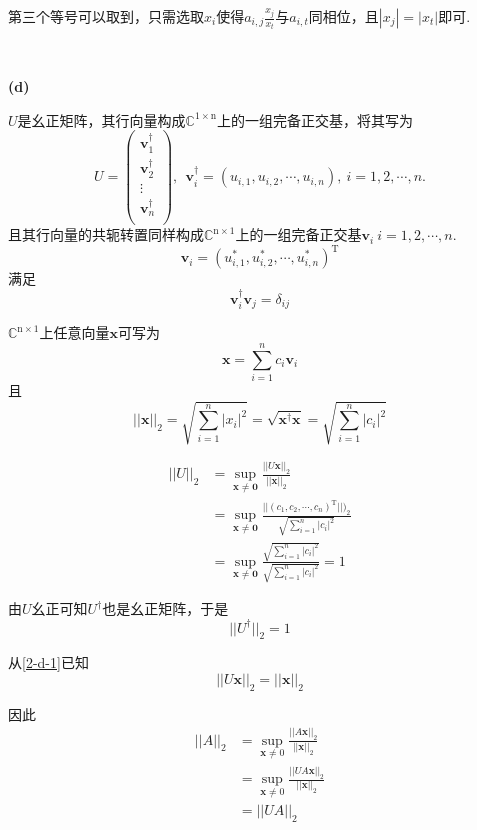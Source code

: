 \documentclass[UTF8]{ctexart}
\begin{document}
第三个等号可以取到，只需选取$x_i$使得$a_{i,j}\frac{x_j}{x_t}$与$a_{i,t}$同相位，且$|x_j|=|x_t|$即可.

~\

\noindent\textbf{(d)}

$U$是幺正矩阵，其行向量构成$\mathbb{C}^{\mathrm{1\times n}}$上的一组完备正交基，将其写为
$$
U=
\left(
    \begin{array}{c}
        \mathbf{v}_1^\dagger \\
        \mathbf{v}_2^\dagger \\
        \vdots\\
        \mathbf{v}_n^\dagger \\
    \end{array}
\right)
,\ \ 
\mathbf{v}_i^\dagger=(u_{i,1},u_{i,2},\cdots,u_{i,n}),\ i=1,2,\cdots,n.
$$
且其行向量的共轭转置同样构成$\mathbb{C}^{\mathrm{n\times 1}}$上的一组完备正交基$\mathbf{v}_i\ i=1,2,\cdots,n.$
$$
\mathbf{v}_i=(u_{i,1}^*,u_{i,2}^*,\cdots,u_{i,n}^*)^\mathrm{T}
$$
满足
$$\mathbf{v}_i^\dagger\mathbf{v}_j=\delta_{ij}$$

$\mathbb{C}^{\mathrm{n\times 1}}$上任意向量$\mathbf{x}$可写为
$$
\mathbf{x}=\sum_{i=1}^n c_i\mathbf{v}_i
$$
且
$$
||\mathbf{x}||_2=\sqrt{\sum_{i=1}^n|x_i|^2}=\sqrt{\mathbf{x}^\dagger\mathbf{x}}=\sqrt{\sum_{i=1}^n|c_i|^2}
$$

\begin{equation}\label{2-d-1}
\begin{aligned}
||U||_2&=\sup_{\mathbf{x}\neq \mathbf{0}}\frac{||U\mathbf{x}||_2}{||\mathbf{x}||_2}\\
&=\sup_{\mathbf{x}\neq \mathbf{0}}\frac{||(c_1,c_2,\cdots,c_n)^\mathrm{T}||)_2}{\sqrt{\sum_{i=1}^n|c_i|^2}}\\
&=\sup_{\mathbf{x}\neq \mathbf{0}}\frac{\sqrt{\sum_{i=1}^n|c_i|^2}}{\sqrt{\sum_{i=1}^n|c_i|^2}}=1
\end{aligned}
\end{equation}

由$U$幺正可知$U^\dagger$也是幺正矩阵，于是
\begin{equation}\label{2-d-2}
||U^\dagger||_2=1
\end{equation}

从\eqref{2-d-1}已知
\begin{equation}\label{2-d-3}
    ||U\mathbf{x}||_2=||\mathbf{x}||_2
\end{equation}

因此
\begin{equation}\label{2-d-4}
    \begin{aligned}
    ||A||_2&=\sup_{\mathbf{x}\neq 0}\frac{||A\mathbf{x}||_2}{||\mathbf{x}||_2}\\
    &=\sup_{\mathbf{x}\neq 0}\frac{||UA\mathbf{x}||_2}{||\mathbf{x}||_2}\\
    &=||UA||_2
    \end{aligned}
\end{equation}
\end{document}
